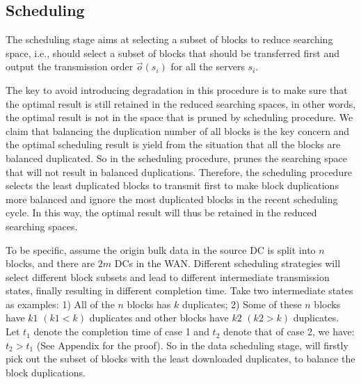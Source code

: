 
\subsection{Scheduling}
\label{subsec:logic:scheduling}

The scheduling stage aims at selecting a subset of blocks to reduce searching space, i.e., \name should select a subset of blocks that should be transferred first and output the transmission order $\overrightarrow{o}(s_i)$ for all the servers $s_i$.

The key to avoid introducing degradation in this procedure is to make sure that the optimal result is still retained in the reduced searching spaces, in other words, the optimal result is not in the space that is pruned by scheduling procedure. We claim that balancing the duplication number of all blocks is the key concern and the optimal scheduling result is yield from the situation that all the blocks are balanced duplicated. So in the scheduling procedure, \name prunes the searching space that will not result in balanced duplications. Therefore, the scheduling procedure selects the least duplicated blocks to transmit first to make block duplications more balanced and ignore the most duplicated blocks in the recent scheduling cycle. In this way, the optimal result will thus be retained in the reduced searching spaces.

To be specific, assume the origin bulk data in the source DC is split into $n$ blocks, and there are $2m$ DCs in the WAN. Different scheduling strategies will select different block subsets and lead to different intermediate transmission states, finally resulting in different completion time. Take two intermediate states as examples: 1) All of the $n$ blocks has $k$ duplicates; 2) Some of these $n$ blocks have $k1$ $(k1<k)$ duplicates and other blocks have $k2$ $(k2>k)$ duplicates. Let $t_1$ denote the completion time of case 1 and $t_2$ denote that of case 2, we have: $t_2 > t_1$ (See Appendix for the proof). So in the data scheduling stage, \name will firstly pick out the subset of blocks with the least downloaded duplicates, to balance the block duplications.


